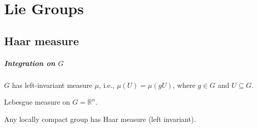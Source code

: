 \documentclass[../../note.tex]{subfiles}
\begin{document}
\chapter{Lie Groups}

\section{Haar measure}
\paragraph{Integration on $G$}
$G$ has left-invariant measure $\mu$, i.e., $\mu(U) = \mu(g U)$, where $g \in G$ and $U \subseteq G$.

\begin{example}
    Lebesgue measure on $G = \mathbb{R}^n$.
\end{example}

\begin{theorem}
    Any locally compact group has Haar measure (left invariant).
\end{theorem}
\end{document}

